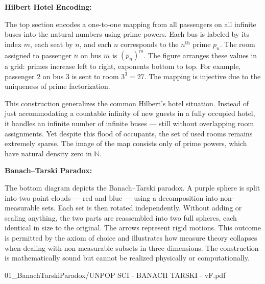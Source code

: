 \begin{SideNotePage}{
  \textbf{Hilbert Hotel Encoding:} \par
  The top section encodes a one-to-one mapping from all passengers on all infinite buses into the natural numbers using prime powers. Each bus is labeled by its index $m$, each seat by $n$, and each $n$ corresponds to the $n^\text{th}$ prime $p_n$. The room assigned to passenger $n$ on bus $m$ is $(p_n)^m$. The figure arranges these values in a grid: primes increase left to right, exponents bottom to top. For example, passenger 2 on bus 3 is sent to room $3^3 = 27$. The mapping is injective due to the uniqueness of prime factorization.

  \vspace{0.5em}
  This construction generalizes the common Hilbert’s hotel situation. Instead of just accommodating a countable infinity of new guests in a fully occupied hotel, it handles an infinite number of infinite buses — still without overlapping room assignments. Yet despite this flood of occupants, the set of used rooms remains extremely sparse. The image of the map consists only of prime powers, which have natural density zero in $\mathbb{N}$.
  
  \vspace{1.5em}
  \textbf{Banach–Tarski Paradox:} \par
  The bottom diagram depicts the Banach–Tarski paradox. A purple sphere is split into two point clouds — red and blue — using a decomposition into non-measurable sets. Each set is then rotated independently. Without adding or scaling anything, the two parts are reassembled into two full spheres, each identical in size to the original. The arrows represent rigid motions. This outcome is permitted by the axiom of choice and illustrates how measure theory collapses when dealing with non-measurable subsets in three dimensions. The construction is mathematically sound but cannot be realized physically or computationally.
}{01_BanachTarskiParadox/UNPOP SCI - BANACH TARSKI - vF.pdf}
\end{SideNotePage}
